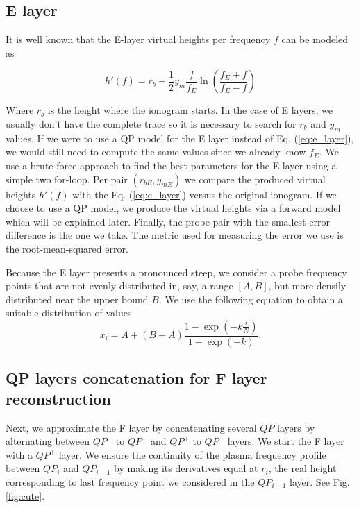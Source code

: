 \documentclass[aps,twocolumn,prb,showpacs,superscriptaddress]{revtex4-2}
\newcommand{\+}{\dagger}
\begin{document}
\subsection{E layer}

It is well known that the E-layer virtual heights per frequency $f$ can be modeled as

\begin{equation}
h'(f) = r_b + \frac{1}{2} y_m \frac{f}{f_E} \ln \left( \frac{f_E + f}{f_E - f} \right)
\label{eq:e_layer}
\end{equation}

Where $r_b$ is the height where the ionogram starts. In the case of E layers, we usually don't have the complete trace so it is necessary to search for $r_b$ and $y_m$ values. If we were to use a QP model for the E layer instead of Eq. (\ref{eq:e_layer}), we would still need to compute the same values since we already know $f_E$. We use a brute-force approach to find the best parameters for the E-layer using a simple two for-loop. Per pair $(r_{bE}, y_{mE})$ we compare the produced virtual heights $h'(f)$ with the Eq. (\ref{eq:e_layer}) versus the original ionogram. If we choose to use a QP model, we produce the virtual heights via a forward model which will be explained later. Finally, the probe pair with the smallest error difference is the one we take. The metric used for measuring the error we use is the root-mean-squared error.

Because the E layer presents a pronounced steep, we consider a probe frequency points that are not evenly distributed in, say, a range $[A,B]$, but more densily distributed near the upper bound $B$. We use the following equation to obtain a suitable distribution of values
\begin{equation}
    x_i = A + (B - A) \frac{1 - \exp\left(-k \frac{i}{N}\right)}{1 - \exp(-k)}.
\end{equation}  

\subsection{QP layers concatenation for F layer reconstruction}
Next, we approximate the F layer by concatenating several $QP$ layers by alternating between $QP^-$ to $QP^+$ and $QP^+$ to $QP^-$ layers. We start the F layer with a $QP^+$ layer. We ensure the continuity of the plasma frequency profile between $QP_i$ and $QP_{i-1}$ by making its derivatives equal at $r_i$, the real height corresponding to last frequency point we considered in the $QP_{i-1}$ layer. See Fig. \ref{fig:cute}.
\end{document}
